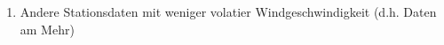 \documentclass[
12pt, %
toc=listofnumbered, %
toc=chapterentrydotfill, %
numbers=noenddot, %
captions=tableheading, %
bibliography=numbered
]{scrreprt}
\let\Oldsection\section
\renewcommand{\section}{\FloatBarrier\Oldsection}
\begin{document}
\begin{enumerate}
	\item Andere Stationsdaten mit weniger volatier Windgeschwindigkeit (d.h. Daten am Mehr)
\end{enumerate}

\end{document}
